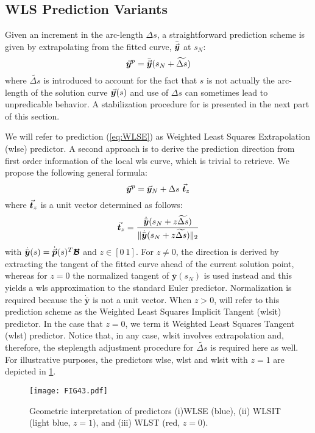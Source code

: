 \subsection{WLS Prediction Variants}\label{CH5-S2SS2}

Given an increment in the arc-length $\Delta s$, a straightforward prediction
scheme is given by extrapolating from the fitted curve, $\bar{\vec{\bm{y}}}$ at 
$s_N$:
\begin{equation}
	\vec{\bm{y}}^p = \bar{\vec{\bm{y}}}(s_N+\widetilde{\Delta s})
	\label{eq:WLSE}
\end{equation}
where $\widetilde{\Delta s}$ is introduced to account for the fact that $s$ is
not actually the arc-length of the solution curve $\vec{\bm{y}}(s)$ and use of 
$\Delta s$ can 
sometimes lead to unpredicable behavior. A stabilization procedure for is 
presented in the next part of this section. 

We will refer to prediction (\ref{eq:WLSE}) as Weighted Least Squares 
Extrapolation (\acrshort{wlse}) predictor. A second approach is to derive the 
prediction direction from first order
information of the local \acrshort{wls} curve, which is trivial to retrieve. We 
propose the following general formula:
\begin{equation}
	\vec{\bm{y}}^p = \vec{\bm{y}}_N + \Delta s\ \vec{\bm{t}}_z
	\label{eq:WLSIT}
\end{equation}
where $\vec{\bm{t}}_z$ is a unit vector determined as follows:
\begin{equation}
	\vec{\bm{t}}_z = \dfrac{\dot{\bar{\bm{y}}}(s_N+z\widetilde{\Delta
			s})}{\Vert\dot{\bar{\bm{y}}}(s_N+z\widetilde{\Delta s})\Vert_2}
	\label{eq:ImplicitTangent}
\end{equation}
with $\dot{\bar{\bm{y}}}(s)=\dot{\vec{\bm{p}}}(s)^T\bm{\mathcal{B}}$ and $z\in[0\ 
1]$. For
$z\neq 0$, the direction is derived by extracting the tangent of the fitted
curve ahead of the current solution point, whereas for $z=0$ the normalized 
tangent of $\bar{\bm{y}}(s_N)$ is used instead and this yields a
\acrshort{wls} approximation to the standard Euler predictor. Normalization is 
required
because the $\dot{\bar{\bm{y}}}$ is not a unit vector. When $z>0$, will refer to
this prediction scheme as the Weighted Least Squares Implicit Tangent 
(\acrshort{wlsit}) predictor. In the case that $z=0$, we term it Weighted Least 
Squares Tangent
(\acrshort{wlst}) predictor. Notice that, in any case, \acrshort{wlsit} 
involves extrapolation and,
therefore, the steplength adjustment procedure for $\widetilde{\Delta s}$ is
required here as well. For illustrative purposes, the predictors 
\acrshort{wlse}, \acrshort{wlst}
and \acrshort{wlsit} with $z=1$ are depicted in 
\ref{fig:DifferentialPredictors}.
\begin{figure}[t]
	\centering
	\texttt{[image: FIG43.pdf]}
	\caption{Geometric interpretation of predictors (i)WLSE (blue), (ii) WLSIT
		(light blue, $z=1$), and (iii) WLST (red, $z=0$).}
	\label{fig:DifferentialPredictors}
\end{figure}

